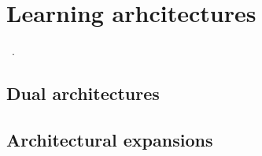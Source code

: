 \chapter{Learning arhcitectures}\label{ch:architecture}

~\cite{Mallya2018, Schwarz2018, Shin2017, Lu2019, Lu2020, Sprechmann2018}.

\section{Dual architectures}\label{sec:dual}

\section{Architectural expansions}\label{sec:expansions}